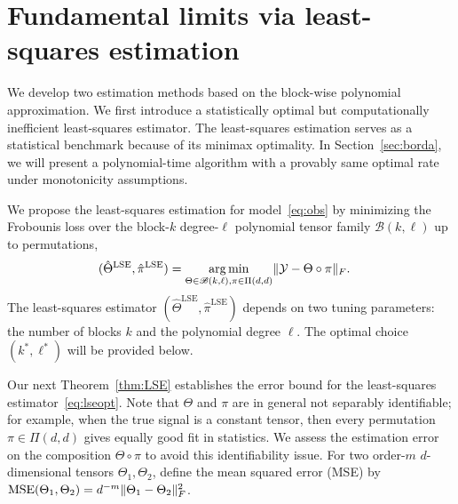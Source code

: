 \documentclass[11pt]{article}
\theoremstyle{definition}
\def\caliB{\mathscr{B}}
\begin{document}
\section{Fundamental limits via least-squares estimation}\label{sec:lse}
We develop two estimation methods based on the block-wise polynomial approximation. We first introduce a statistically optimal but computationally inefficient least-squares estimator. The least-squares estimation serves as a statistical benchmark because of its minimax optimality. In Section~\ref{sec:borda}, we will present a polynomial-time algorithm with a provably same optimal rate under monotonicity assumptions.

We propose the least-squares estimation for model~\eqref{eq:obs} by minimizing the Frobounis loss over the block-$k$ degree-$\ell$ polynomial tensor family $\caliB(k,\ell)$ up to permutations, 
\begin{align}\label{eq:lseopt}
    (\hat\Theta^{\text{LSE}},\hat \pi^{\text{LSE}}) &= \argmin_{\Theta\in\caliB(k,\ell), \pi\in \Pi(d,d)}\FnormSize{}{\tY-\Theta\circ\pi}.
\end{align}
The least-squares estimator $(\hat\Theta^{\text{LSE}},\hat\pi^{\text{LSE}})$ depends on two tuning parameters: the number of blocks $k$ and the polynomial degree $\ell$. The optimal choice $(k^*,\ell^*)$ will be provided below. 

Our next Theorem~\ref{thm:LSE} establishes the error bound for the least-squares estimator~\eqref{eq:lseopt}. Note that $\Theta$ and $\pi$ are in general not separably identifiable; for example, when the true signal is a constant tensor, then every permutation $\pi\in \Pi(d,d)$ gives equally good fit in statistics. We assess the estimation error on the composition $\Theta \circ \pi$ to avoid this identifiability issue. For two order-$m$ $d$-dimensional tensors $\Theta_1, \Theta_2$, define the mean squared error (MSE) by $\textup{MSE}(\Theta_1,\Theta_2) = d^{-m}\lVert\Theta_1-\Theta_2\rVert_F^2$. 
 
\end{document}

